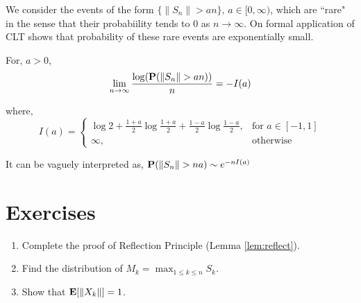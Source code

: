 \documentclass[main]{subfiles}
\begin{document}
We consider the events of the form $\{\lVert S_n \rVert > an\},\,a\in [0,\infty)$, which are ``rare" in the sense that their probabiility tends to 0 as $n \to \infty$. On formal application of CLT shows that probability of these rare events are exponentially small.
\begin{theorem}
    \normalfont
    For, $a>0$,
    $$\lim\limits_{n \to \infty} \frac{\log(\P(\lVert S_n \rVert > an))}{n} = -I(a)$$

    where,
    $$
        I(a) =
        \begin{cases}
            \log2 + \frac{1+a}{2}\log \frac{1+a}{2} + \frac{1-a}{2} \log\frac{1-a}{2}, & \text{for}\,\,a \in [-1,1] \\
            \infty,                                                                    & \text{otherwise}
        \end{cases}
    $$

    It can be vaguely interpreted as, $\P(\lVert S_n \rVert > na) \sim e^{-nI(a)}$
\end{theorem}

\section{Exercises}
\begin{enumerate}
    \item Complete the proof of Reflection Principle (Lemma \ref{lem:reflect}).
    \item Find the distribution of $M_k=\max_{1\leq k\leq n} S_k$.
    \item Show that $\E[\lVert X_k \rVert] = 1$.
\end{enumerate}
\end{document}
